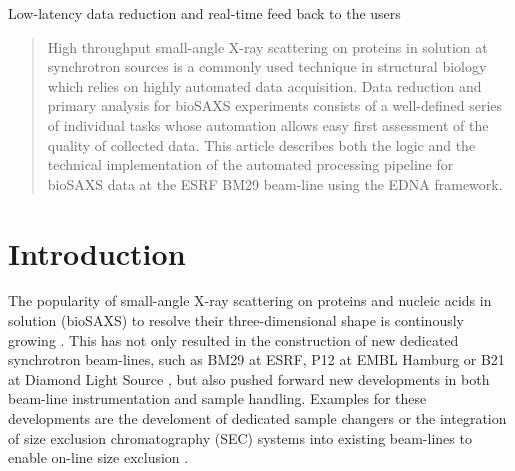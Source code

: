 \documentclass[preprint,pdf]{iucr}              %
\begin{document}
\maketitle                        %

\begin{synopsis}
Low-latency data reduction and real-time feed back to the users
\end{synopsis}

\begin{abstract}
High throughput small-angle X-ray scattering on proteins in solution at
synchrotron sources is a commonly used technique in structural biology which
relies on highly automated data acquisition.
Data reduction and primary analysis for bioSAXS experiments consists of a
well-defined series of individual tasks whose automation allows easy first
assessment of the quality of collected data.
This article describes both the logic and the technical implementation of the
automated processing pipeline for bioSAXS data at the ESRF BM29 beam-line using
the EDNA framework.
\end{abstract}



\section{Introduction}
The popularity of small-angle X-ray scattering on proteins and nucleic acids in
solution (bioSAXS) to resolve their three-dimensional shape is continously
growing \cite{Graewert2013,Hura2009,Reyes2014}.
This has not only resulted in the construction of new dedicated
synchrotron beam-lines, such as BM29 at ESRF, P12 at EMBL Hamburg or B21 at
Diamond Light Source \cite{BM29paper,P12,B21}, but also pushed forward new
developments in both beam-line instrumentation and sample handling.
Examples for these developments are the develoment of dedicated sample changers
\cite{SCPaper} or the integration of size exclusion chromatography (SEC) systems
into existing beam-lines to enable on-line size exclusion \cite{SECPaper2012}.
\end{document}
